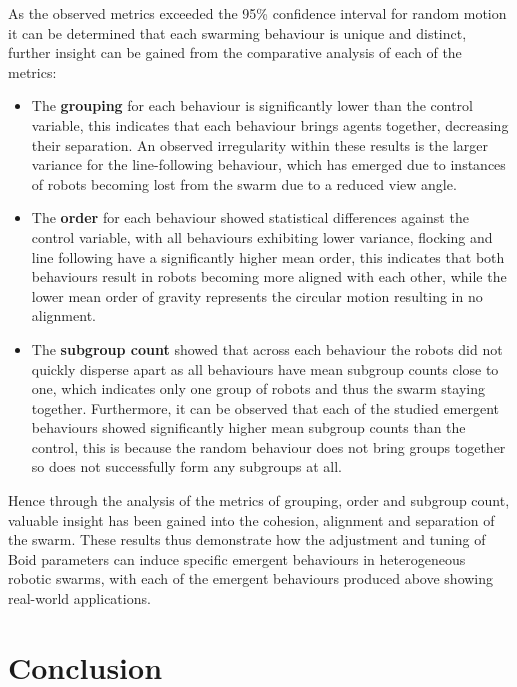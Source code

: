 \documentclass[conference]{IEEEtran}
\begin{document}
 As the observed metrics exceeded the 95\% confidence interval for random motion it can be determined that each swarming behaviour is unique and distinct, further insight can be gained from the comparative analysis of each of the metrics: 
\begin{itemize}

    \item The \textbf{grouping} for each behaviour is significantly lower than the control variable, this indicates that each behaviour brings agents together, decreasing their separation. An observed irregularity within these results is the larger variance for the line-following behaviour, which has emerged due to instances of robots becoming lost from the swarm due to a reduced view angle.
    
    \item The \textbf{order} for each behaviour showed statistical differences against the control variable, with all behaviours exhibiting lower variance, flocking and line following have a significantly higher mean order, this indicates that both behaviours result in robots becoming more aligned with each other, while the lower mean order of gravity represents the circular motion resulting in no alignment.

    \item The \textbf{subgroup count} showed that across each behaviour the robots did not quickly disperse apart as all behaviours have mean subgroup counts close to one, which indicates only one group of robots and thus the swarm staying together. Furthermore, it can be observed that each of the studied emergent behaviours showed significantly higher mean subgroup counts than the control, this is because the random behaviour does not bring groups together so does not successfully form any subgroups at all.
    
\end{itemize}

Hence through the analysis of the metrics of grouping, order and subgroup count, valuable insight has been gained into the cohesion, alignment and separation of the swarm. These results thus demonstrate how the adjustment and tuning of Boid parameters can induce specific emergent behaviours in heterogeneous robotic swarms, with each of the emergent behaviours produced above showing real-world applications. 

\FloatBarrier
\section{Conclusion}
\end{document}
